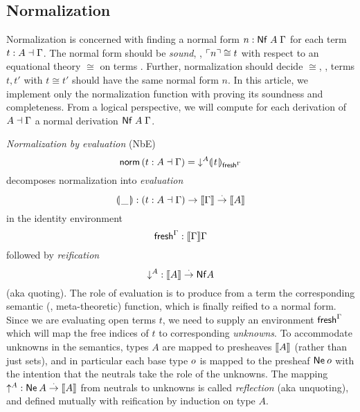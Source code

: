 \documentclass[sigplan,screen,fleqn]{acmart}
\begin{document}
\subsection{Normalization}

Normalization is concerned with finding a normal form
$n : \mathsf{Nf}\;A\;\Gamma$ for each term $t : A \dashv \Gamma$.
The normal form should be \emph{sound},
\ie, $\ulcorner n\urcorner \cong t$
with respect to an equational theory $\cong$ on terms%
. %
Further, normalization should decide $\cong$, \ie,
terms $t,t'$ with $t \cong t'$ should have the same normal form $n$.
In this article, we implement only the normalization function
with proving its soundness and completeness.
From a logical perspective, we will compute for each derivation of $A
\dashv \Gamma$ a normal derivation $\mathsf{Nf}\;A\;\Gamma$.



%
\emph{Normalization by evaluation} (NbE)
\[
  \mathsf{norm}\, (t : A \dashv \Gamma)
  = \mathord{\downarrow_{}^{A}} \llparenthesis\kern0.3ext\kern0.3ex\rrparenthesis_{\mathsf{fresh}^{\Gamma}}
\]
decomposes normalization into
\emph{evaluation}
\[%
\denty\_ : (t : A \from \Gamma) \to \den \Gamma \todot
  \den A
\]%
in the identity environment
\[%
\idenv\Gamma : \den \Gamma \Gamma
\]%
followed by
\emph{reification}
\[%
\down A : \den A \todot \tNf A
\]%
(aka quoting).
The role of evaluation is to produce from a term the corresponding
semantic (\ie, meta-theoretic) function, which is finally reified to a normal form.
Since we are evaluating open terms $t$, we need to supply an environment
$\mathsf{fresh}^{\Gamma}$ which will map the free indices of $t$ to corresponding
\emph{unknowns}.  To accommodate unknowns in the semantics, types $A$
are mapped to presheaves $\mathopen{{[\kern-0.14em[}} A \mathclose{{]\kern-0.14em]}}$ (rather than just sets), and in
particular each base type $o$ is mapped to the presheaf
$\mathsf{Ne}^{}\,o$ with the intention that the neutrals take the role of
the unknowns.  The mapping $\mathord{\uparrow_{}^{A}} : \mathsf{Ne}^{}\,A \stackrel{\cdot}{\to} \mathopen{{[\kern-0.14em[}} A \mathclose{{]\kern-0.14em]}}$ from
neutrals to unknowns is called \emph{reflection} (aka unquoting), and defined mutually
with reification by induction on type $A$.
\end{document}
